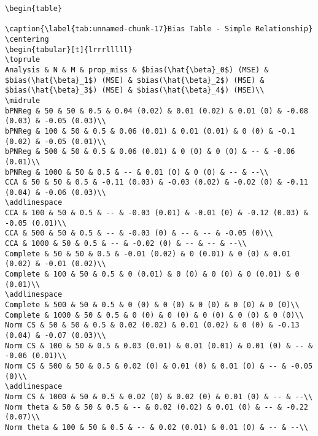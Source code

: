 \documentclass[
]{article}
\begin{document}
\begin{verbatim}
\begin{table}

\caption{\label{tab:unnamed-chunk-17}Bias Table - Simple Relationship}
\centering
\begin{tabular}[t]{lrrrlllll}
\toprule
Analysis & N & M & prop_miss & $bias(\hat{\beta}_0$) (MSE) & $bias(\hat{\beta}_1$) (MSE) & $bias(\hat{\beta}_2$) (MSE) & $bias(\hat{\beta}_3$) (MSE) & $bias(\hat{\beta}_4$) (MSE)\\
\midrule
bPNReg & 50 & 50 & 0.5 & 0.04 (0.02) & 0.01 (0.02) & 0.01 (0) & -0.08 (0.03) & -0.05 (0.03)\\
bPNReg & 100 & 50 & 0.5 & 0.06 (0.01) & 0.01 (0.01) & 0 (0) & -0.1 (0.02) & -0.05 (0.01)\\
bPNReg & 500 & 50 & 0.5 & 0.06 (0.01) & 0 (0) & 0 (0) & -- & -0.06 (0.01)\\
bPNReg & 1000 & 50 & 0.5 & -- & 0.01 (0) & 0 (0) & -- & --\\
CCA & 50 & 50 & 0.5 & -0.11 (0.03) & -0.03 (0.02) & -0.02 (0) & -0.11 (0.04) & -0.06 (0.03)\\
\addlinespace
CCA & 100 & 50 & 0.5 & -- & -0.03 (0.01) & -0.01 (0) & -0.12 (0.03) & -0.05 (0.01)\\
CCA & 500 & 50 & 0.5 & -- & -0.03 (0) & -- & -- & -0.05 (0)\\
CCA & 1000 & 50 & 0.5 & -- & -0.02 (0) & -- & -- & --\\
Complete & 50 & 50 & 0.5 & -0.01 (0.02) & 0 (0.01) & 0 (0) & 0.01 (0.02) & -0.01 (0.02)\\
Complete & 100 & 50 & 0.5 & 0 (0.01) & 0 (0) & 0 (0) & 0 (0.01) & 0 (0.01)\\
\addlinespace
Complete & 500 & 50 & 0.5 & 0 (0) & 0 (0) & 0 (0) & 0 (0) & 0 (0)\\
Complete & 1000 & 50 & 0.5 & 0 (0) & 0 (0) & 0 (0) & 0 (0) & 0 (0)\\
Norm CS & 50 & 50 & 0.5 & 0.02 (0.02) & 0.01 (0.02) & 0 (0) & -0.13 (0.04) & -0.07 (0.03)\\
Norm CS & 100 & 50 & 0.5 & 0.03 (0.01) & 0.01 (0.01) & 0.01 (0) & -- & -0.06 (0.01)\\
Norm CS & 500 & 50 & 0.5 & 0.02 (0) & 0.01 (0) & 0.01 (0) & -- & -0.05 (0)\\
\addlinespace
Norm CS & 1000 & 50 & 0.5 & 0.02 (0) & 0.02 (0) & 0.01 (0) & -- & --\\
Norm theta & 50 & 50 & 0.5 & -- & 0.02 (0.02) & 0.01 (0) & -- & -0.22 (0.07)\\
Norm theta & 100 & 50 & 0.5 & -- & 0.02 (0.01) & 0.01 (0) & -- & --\\

\end{verbatim}
\end{document}
